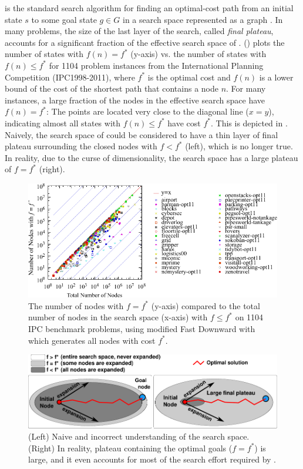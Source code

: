\astar is the standard search
algorithm for finding an optimal-cost path from an initial state $s$ to
some goal state $g \in G$ in a search space represented as a graph
\cite{hart1968formal}.
In many problems, the size of the last layer of the search, called
\emph{final plateau}, accounts for a significant fraction of the
effective search space of \astar.  
() plots the number of states with $f(n) = f^*$
(y-axis) vs. the number of states with $f(n) \leq f^*$ for 1104 problem
instances from the International Planning Competition (IPC1998-2011),
where $f^*$ is the optimal cost and $f(n)$ is a lower bound of the cost of the shortest path
that contains a node $n$.  For many instances, a large
fraction of the nodes in the effective search space have $f(n)=f^*$:
The points are located very close to the diagonal line
($x=y$), indicating almost all states with $f(n) \leq f^*$ have cost $f^*$.
This is depicted in . Naively, the search space of \astar could be considered to have a thin layer of final plateau surrounding the closed nodes with $f<f^*$ (left), which is no longer true. In reality, due to the curse of dimensionality, the search space has a large plateau of $f=f^*$ (right).

\begin{figure}[htbp]
  \centering
  \includegraphics{tables/aaai16-frontier/aaai16prelim3/lmcut_frontier_noh-front.pdf}
 \caption{
 The number of nodes with $f=f^*$ (y-axis) compared to the
 total number of nodes in the search space (x-axis) with $f\leq f^*$ on 1104 IPC benchmark problems,
  using modified Fast Downward with \lmcut which 
  generates all nodes with cost $f^*$.
  }
 \label{fig:plateau-noh}
\end{figure}

\begin{figure}[htbp]
  \centering
  \includegraphics{img/astar/plateau-0.pdf}
 \caption{(Left) Naive and incorrect understanding of the search space. (Right) In reality, plateau containing the optimal goals ($f=f^*$) is large, and it even accounts for most of the search effort required by \astar.
  }
 \label{fig:plateau-0}
\end{figure}

